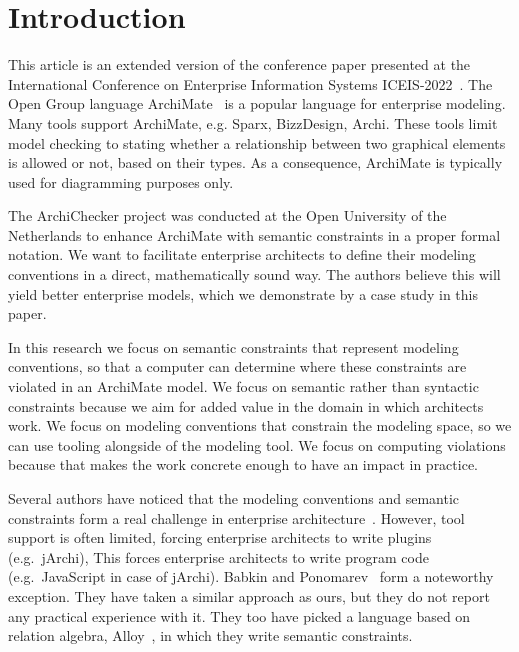 \documentclass[sn-vancouver]{sn-jnl}%
\theoremstyle{thmstyleone}%
\theoremstyle{thmstyletwo}%
\theoremstyle{thmstylethree}%
\begin{document}
\maketitle

\section{Introduction}\label{sec1}
This article is an extended version of the conference paper presented at the International Conference on Enterprise Information Systems ICEIS-2022~\cite{iceis22}.
The Open Group language ArchiMate~\cite{ArchiMate} is a popular language for enterprise modeling.
Many tools support ArchiMate, e.g. Sparx, BizzDesign, Archi.
These tools limit model checking to stating whether a relationship between two graphical elements is allowed or not, based on their types.
As a consequence, ArchiMate is typically used for diagramming purposes only.

The ArchiChecker project was conducted at the Open University of the Netherlands to enhance ArchiMate with semantic constraints in a proper formal notation.
We want to facilitate enterprise architects to define their modeling conventions in a direct, mathematically sound way.
The authors believe this will yield better enterprise models, which we demonstrate by a case study in this paper.

In this research we focus on semantic constraints that represent modeling conventions,
so that a computer can determine where these constraints are violated in an ArchiMate model.
We focus on semantic rather than syntactic constraints because we aim for added value in the domain in which architects work.
We focus on modeling conventions that constrain the modeling space, so we can use tooling alongside of the modeling tool.
We focus on computing violations because that makes the work concrete enough to have an impact in practice.

Several authors have noticed that the modeling conventions and semantic constraints
form a real challenge in enterprise architecture~\cite{kharlamov2016capturing,chatzikonstantinou2012policy,ramos2014automated,bider2020structural}.
However, tool support is often limited, forcing enterprise architects to write plugins (e.g.~jArchi),
This forces enterprise architects to write program code (e.g.~JavaScript in case of jArchi).
Babkin and Ponomarev~\cite{babkin2017analysis} form a noteworthy exception.
They have taken a similar approach as ours, but they do not report any practical experience with it.
They too have picked a language based on relation algebra, Alloy~\cite{Alloy2006}, in which they write semantic constraints.
\end{document}
